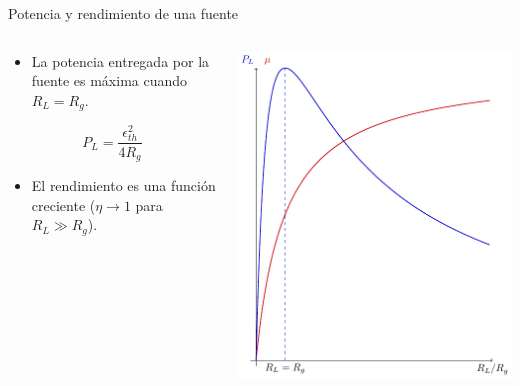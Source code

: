 \documentclass[aspectratio=169, usenames,svgnames,dvipsnames]{beamer}
\begin{document}
\begin{frame}[label={sec:orgfd8f8a1}]{Potencia y rendimiento de una fuente}
\begin{columns}
\begin{column}{0.5\columnwidth}
\begin{itemize}
\item La potencia entregada por la fuente es máxima cuando \(R_L = R_g\).
\end{itemize}

\begin{equation*}
  P_L = \frac{\epsilon^2_{th}}{4 R_g}
\end{equation*}

\begin{itemize}
\item El rendimiento es una función creciente (\(\eta \to 1\) para \(R_L \gg R_g\)).
\end{itemize}
\end{column}

\begin{column}{0.5\columnwidth}
\begin{center}
\includegraphics[height=0.85\textheight]{../figs/FuenteReal_PotenciaRendimiento.pdf}
\end{center}
\end{column}
\end{columns}
\end{frame}
\end{document}

